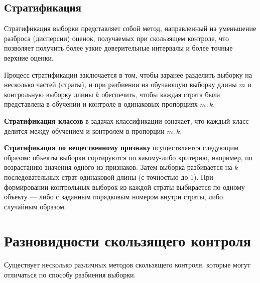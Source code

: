 \subsection{Стратификация}

Стратификация выборки представляет собой метод, направленный на уменьшение разброса (дисперсии) оценок, получаемых при скользящем контроле, что позволяет получить более узкие доверительные интервалы и более точные верхние оценки.

Процесс стратификации заключается в том, чтобы заранее разделить выборку на несколько частей (страты), и при разбиении на обучающую выборку длины $m$ и контрольную выборку длины $k$ обеспечить, чтобы каждая страта была представлена в обучении и контроле в одинаковых пропорциях $m:k$.

\textbf{Стратификация классов} в задачах классификации означает, что каждый класс делится между обучением и контролем в пропорции $m:k$.

\textbf{Стратификация по вещественному признаку} осуществляется следующим образом: объекты выборки сортируются по какому-либо критерию, например, по возрастанию значения одного из признаков. Затем выборка разбивается на $k$ последовательных страт одинаковой длины (с точностью до 1). При формировании контрольных выборок из каждой страты выбирается по одному объекту — либо с заданным порядковым номером внутри страты, либо случайным образом.


\section{Разновидности скользящего контроля}
Существует несколько различных методов скользящего контроля, которые могут отличаться по способу разбиения выборки.
